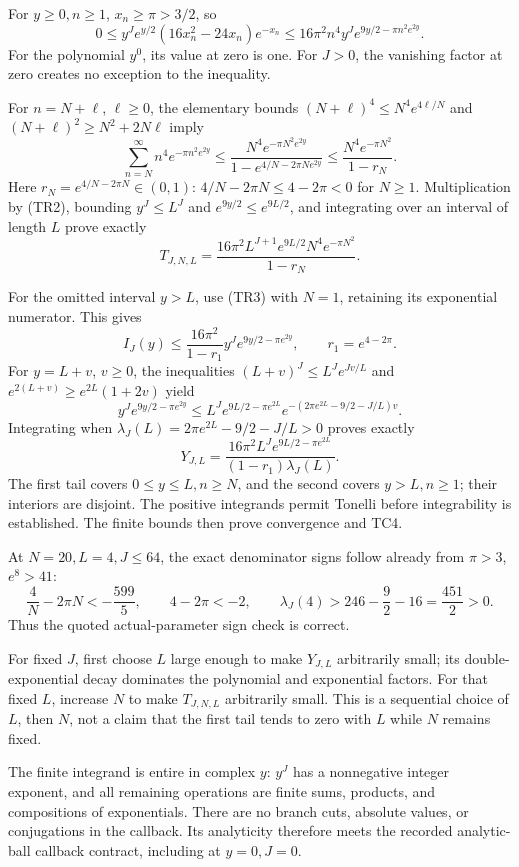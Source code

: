 For \(y\ge0,n\ge1\), \(x_n\ge\pi>3/2\), so \[
0\le y^Je^{y/2}(16x_n^2-24x_n)e^{-x_n}
\le16\pi^2n^4y^Je^{9y/2-\pi n^2e^{2y}}.
\tag{TR2}
\] For the polynomial \(y^0\), its value at zero is one. For \(J>0\), the vanishing factor at zero creates no exception to the inequality.

For \(n=N+\ell\), \(\ell\ge0\), the elementary bounds \((N+\ell)^4\le N^4e^{4\ell/N}\) and \((N+\ell)^2\ge N^2+2N\ell\) imply \[
\sum_{n=N}^{\infty}n^4e^{-\pi n^2e^{2y}}
\le
\frac{N^4e^{-\pi N^2e^{2y}}}
{1-e^{4/N-2\pi Ne^{2y}}}
\le\frac{N^4e^{-\pi N^2}}{1-r_N}.
\tag{TR3}
\] Here \(r_N=e^{4/N-2\pi N}\in(0,1)\): \(4/N-2\pi N\le4-2\pi<0\) for \(N\ge1\). Multiplication by (TR2), bounding \(y^J\le L^J\) and \(e^{9y/2}\le e^{9L/2}\), and integrating over an interval of length \(L\) prove exactly \[
T_{J,N,L}
=\frac{16\pi^2L^{J+1}e^{9L/2}N^4e^{-\pi N^2}}{1-r_N}.
\tag{TR4}
\]

For the omitted interval \(y>L\), use (TR3) with \(N=1\), retaining its exponential numerator. This gives \[
I_J(y)\le\frac{16\pi^2}{1-r_1}
y^Je^{9y/2-\pi e^{2y}},\qquad r_1=e^{4-2\pi}.
\tag{TR5}
\] For \(y=L+v\), \(v\ge0\), the inequalities \((L+v)^J\le L^Je^{Jv/L}\) and \(e^{2(L+v)}\ge e^{2L}(1+2v)\) yield \[
y^Je^{9y/2-\pi e^{2y}}
\le L^Je^{9L/2-\pi e^{2L}}
e^{-(2\pi e^{2L}-9/2-J/L)v}.
\tag{TR6}
\] Integrating when \(\lambda_J(L)=2\pi e^{2L}-9/2-J/L>0\) proves exactly \[
Y_{J,L}
=\frac{16\pi^2L^Je^{9L/2-\pi e^{2L}}}
{(1-r_1)\lambda_J(L)}.
\tag{TR7}
\] The first tail covers \(0\le y\le L,n\ge N\), and the second covers \(y>L,n\ge1\); their interiors are disjoint. The positive integrands permit Tonelli before integrability is established. The finite bounds then prove convergence and TC4.

At \(N=20,L=4,J\le64\), the exact denominator signs follow already from \(\pi>3\), \(e^8>41\): \[
\frac4N-2\pi N<-\frac{599}{5},\qquad
4-2\pi<-2,\qquad
\lambda_J(4)>246-\frac92-16=\frac{451}{2}>0.
\tag{TR8}
\] Thus the quoted actual-parameter sign check is correct.

For fixed \(J\), first choose \(L\) large enough to make \(Y_{J,L}\) arbitrarily small; its double-exponential decay dominates the polynomial and exponential factors. For that fixed \(L\), increase \(N\) to make \(T_{J,N,L}\) arbitrarily small. This is a sequential choice of \(L\), then \(N\), not a claim that the first tail tends to zero with \(L\) while \(N\) remains fixed.

The finite integrand is entire in complex \(y\): \(y^J\) has a nonnegative integer exponent, and all remaining operations are finite sums, products, and compositions of exponentials. There are no branch cuts, absolute values, or conjugations in the callback. Its analyticity therefore meets the recorded analytic-ball callback contract, including at \(y=0,J=0\).

